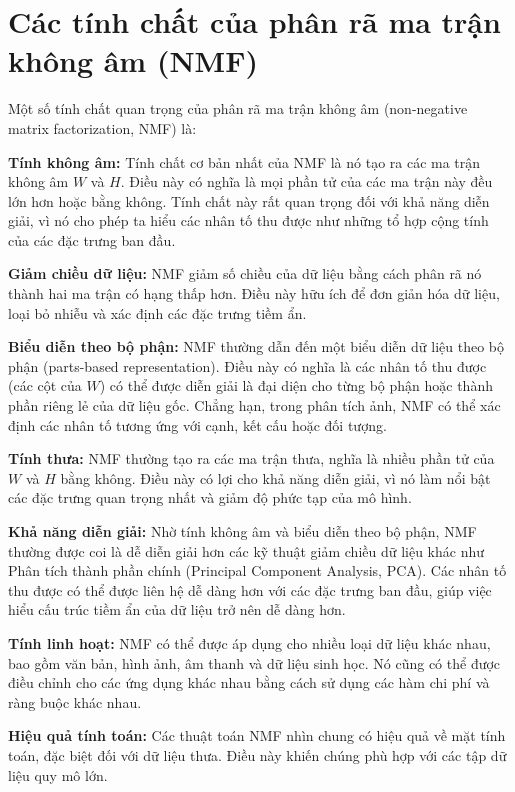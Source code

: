 \section{Các tính chất của phân rã ma trận không âm (NMF)}

Một số tính chất quan trọng của phân rã ma trận không âm (non-negative matrix factorization, NMF) là:

\textbf{Tính không âm:} Tính chất cơ bản nhất của NMF là nó tạo ra các ma trận không âm \(W\) và \(H\). Điều này có nghĩa là mọi phần tử của các ma trận này đều lớn hơn hoặc bằng không. Tính chất này rất quan trọng đối với khả năng diễn giải, vì nó cho phép ta hiểu các nhân tố thu được như những tổ hợp cộng tính của các đặc trưng ban đầu.

\textbf{Giảm chiều dữ liệu:} NMF giảm số chiều của dữ liệu bằng cách phân rã nó thành hai ma trận có hạng thấp hơn. Điều này hữu ích để đơn giản hóa dữ liệu, loại bỏ nhiễu và xác định các đặc trưng tiềm ẩn.

\textbf{Biểu diễn theo bộ phận:} NMF thường dẫn đến một biểu diễn dữ liệu theo bộ phận (parts-based representation). Điều này có nghĩa là các nhân tố thu được (các cột của \(W\)) có thể được diễn giải là đại diện cho từng bộ phận hoặc thành phần riêng lẻ của dữ liệu gốc. Chẳng hạn, trong phân tích ảnh, NMF có thể xác định các nhân tố tương ứng với cạnh, kết cấu hoặc đối tượng.

\textbf{Tính thưa:} NMF thường tạo ra các ma trận thưa, nghĩa là nhiều phần tử của \(W\) và \(H\) bằng không. Điều này có lợi cho khả năng diễn giải, vì nó làm nổi bật các đặc trưng quan trọng nhất và giảm độ phức tạp của mô hình.

\textbf{Khả năng diễn giải:} Nhờ tính không âm và biểu diễn theo bộ phận, NMF thường được coi là dễ diễn giải hơn các kỹ thuật giảm chiều dữ liệu khác như Phân tích thành phần chính (Principal Component Analysis, PCA). Các nhân tố thu được có thể được liên hệ dễ dàng hơn với các đặc trưng ban đầu, giúp việc hiểu cấu trúc tiềm ẩn của dữ liệu trở nên dễ dàng hơn.

\textbf{Tính linh hoạt:} NMF có thể được áp dụng cho nhiều loại dữ liệu khác nhau, bao gồm văn bản, hình ảnh, âm thanh và dữ liệu sinh học. Nó cũng có thể được điều chỉnh cho các ứng dụng khác nhau bằng cách sử dụng các hàm chi phí và ràng buộc khác nhau.

\textbf{Hiệu quả tính toán:} Các thuật toán NMF nhìn chung có hiệu quả về mặt tính toán, đặc biệt đối với dữ liệu thưa. Điều này khiến chúng phù hợp với các tập dữ liệu quy mô lớn.

